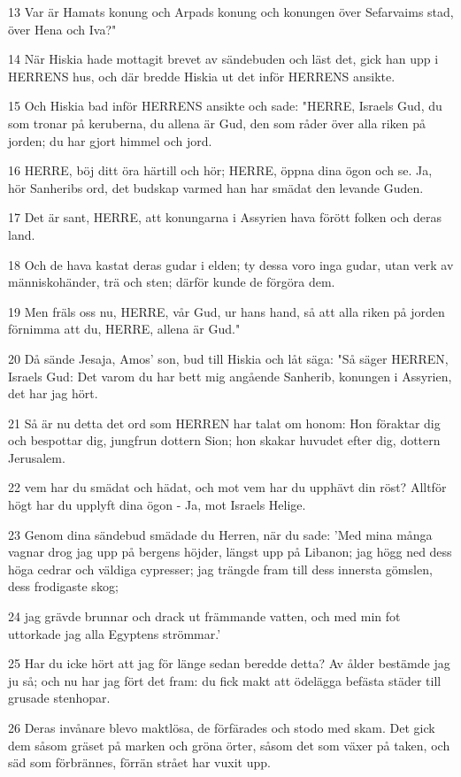 \par 13 Var är Hamats konung och Arpads konung och konungen över Sefarvaims stad, över Hena och Iva?"
\par 14 När Hiskia hade mottagit brevet av sändebuden och läst det, gick han upp i HERRENS hus, och där bredde Hiskia ut det inför HERRENS ansikte.
\par 15 Och Hiskia bad inför HERRENS ansikte och sade: "HERRE, Israels Gud, du som tronar på keruberna, du allena är Gud, den som råder över alla riken på jorden; du har gjort himmel och jord.
\par 16 HERRE, böj ditt öra härtill och hör; HERRE, öppna dina ögon och se. Ja, hör Sanheribs ord, det budskap varmed han har smädat den levande Guden.
\par 17 Det är sant, HERRE, att konungarna i Assyrien hava förött folken och deras land.
\par 18 Och de hava kastat deras gudar i elden; ty dessa voro inga gudar, utan verk av människohänder, trä och sten; därför kunde de förgöra dem.
\par 19 Men fräls oss nu, HERRE, vår Gud, ur hans hand, så att alla riken på jorden förnimma att du, HERRE, allena är Gud."
\par 20 Då sände Jesaja, Amos' son, bud till Hiskia och låt säga: "Så säger HERREN, Israels Gud: Det varom du har bett mig angående Sanherib, konungen i Assyrien, det har jag hört.
\par 21 Så är nu detta det ord som HERREN har talat om honom: Hon föraktar dig och bespottar dig, jungfrun dottern Sion; hon skakar huvudet efter dig, dottern Jerusalem.
\par 22 vem har du smädat och hädat, och mot vem har du upphävt din röst? Alltför högt har du upplyft dina ögon - Ja, mot Israels Helige.
\par 23 Genom dina sändebud smädade du Herren, när du sade: 'Med mina många vagnar drog jag upp på bergens höjder, längst upp på Libanon; jag högg ned dess höga cedrar och väldiga cypresser; jag trängde fram till dess innersta gömslen, dess frodigaste skog;
\par 24 jag grävde brunnar och drack ut främmande vatten, och med min fot uttorkade jag alla Egyptens strömmar.'
\par 25 Har du icke hört att jag för länge sedan beredde detta? Av ålder bestämde jag ju så; och nu har jag fört det fram: du fick makt att ödelägga befästa städer till grusade stenhopar.
\par 26 Deras invånare blevo maktlösa, de förfärades och stodo med skam. Det gick dem såsom gräset på marken och gröna örter, såsom det som växer på taken, och säd som förbrännes, förrän strået har vuxit upp.
